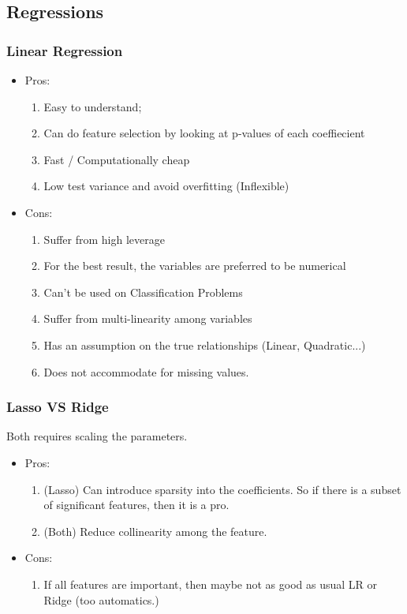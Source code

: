 \documentclass[12pt]{amsart}
\numberwithin{equation}{section}
\theoremstyle{plain}
\theoremstyle{definition}
\begin{document}
\subsection{Regressions}
\subsubsection{Linear Regression}

\begin{itemize}
\item Pros: 

\begin{enumerate}
\item Easy to understand;
\item Can do feature selection by looking at p-values of each coeffiecient
\item Fast / Computationally cheap
\item Low test variance and avoid overfitting (Inflexible)
\end{enumerate}

\item Cons:

\begin{enumerate}
\item Suffer from high leverage
\item For the best result, the variables are preferred to be numerical
\item Can't be used on Classification Problems
\item Suffer from multi-linearity among variables
\item Has an assumption on the true relationships (Linear, Quadratic...)
\item Does not accommodate for missing values.
\end{enumerate}

\end{itemize}

\subsubsection{Lasso VS Ridge}
Both requires scaling the parameters.
\begin{itemize}
\item Pros:

\begin{enumerate}
\item (Lasso) Can introduce sparsity into the coefficients. So if there is a subset of significant features, then it is a pro.
\item (Both) Reduce collinearity among the feature.
\end{enumerate}

\item Cons:

\begin{enumerate}
\item If all features are important, then maybe not as good as usual LR or Ridge (too automatics.)
\end{enumerate}

\end{itemize}
\end{document}
